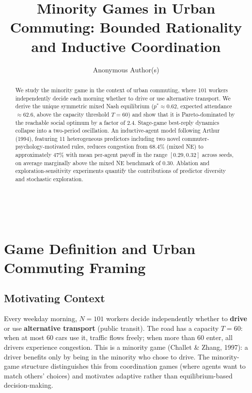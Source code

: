 \documentclass[letterpaper]{article}
\title{{\LARGE \bfseries Minority Games in Urban Commuting: Bounded Rationality and Inductive Coordination}}
\author {
    Anonymous Author(s)
}
\begin{document}
\maketitle \\

\begin{abstract}
We study the minority game in the context of urban commuting, where 101 workers independently decide each morning whether to drive or use alternative transport. We derive the unique symmetric mixed Nash equilibrium ($p^* \approx 0.62$, expected attendance $\approx 62.6$, above the capacity threshold $T=60$) and show that it is Pareto-dominated by the reachable social optimum by a factor of 2.4. Stage-game best-reply dynamics collapse into a two-period oscillation. An inductive-agent model following Arthur (1994), featuring 11 heterogeneous predictors including two novel commuter-psychology-motivated rules, reduces congestion from 68.4\% (mixed NE) to approximately 47\% with mean per-agent payoff in the range $[0.29, 0.32]$ across seeds, on average marginally above the mixed NE benchmark of 0.30. Ablation and exploration-sensitivity experiments quantify the contributions of predictor diversity and stochastic exploration. \\
\end{abstract}

\section{Game Definition and Urban Commuting Framing}

\subsection{Motivating Context}

Every weekday morning, $N=101$ workers decide independently whether to \textbf{drive} or use \textbf{alternative transport} (public transit). The road has a capacity $T=60$: when at most 60 cars use it, traffic flows freely; when more than 60 enter, all drivers experience congestion. This is a minority game (Challet \& Zhang, 1997): a driver benefits only by being in the minority who chose to drive. The minority-game structure distinguishes this from coordination games (where agents want to match others' choices) and motivates adaptive rather than equilibrium-based decision-making. \\
\end{document}
